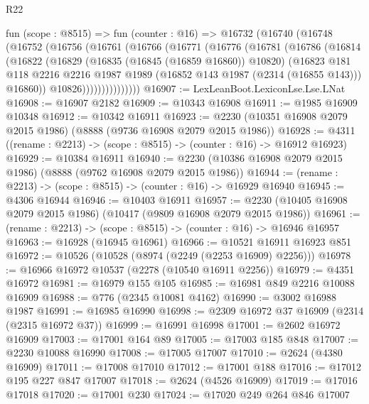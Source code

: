 \begin{lexlean}{R22}
\begin{coremodule}
        fun (scope : @8515) =>
        fun (counter : @16) =>
        @16732
          (@16740
            (@16748
              (@16752
                (@16756
                  (@16761
                    (@16766
                      (@16771
                        (@16776
                          (@16781
                            (@16786
                              (@16814
                                (@16822
                                  (@16829
                                    (@16835 (@16845 (@16859 @16860)) @10820)
                                    (@16823
                                      @181
                                      @118
                                      @2216
                                      @2216
                                      @1987
                                      @1989
                                      (@16852 @143 @1987 (@2314 (@16855 @143)))
                                      @16860))
                                  @10826)))))))))))))))
@16907 := LexLeanBoot.LexiconLse.Lse.LNat
@16908 := @16907 @2182
@16909 := @10343 @16908
@16911 := @1985 @16909 @10348
@16912 := @10342 @16911
@16923 := @2230 (@10351 @16908 @2079 @2015 @1986) (@8888 (@9736 @16908 @2079 @2015 @1986))
@16928 := @4311 ((rename : @2213) -> (scope : @8515) -> (counter : @16) -> @16912 @16923)
@16929 := @10384 @16911
@16940 := @2230 (@10386 @16908 @2079 @2015 @1986) (@8888 (@9762 @16908 @2079 @2015 @1986))
@16944 := (rename : @2213) -> (scope : @8515) -> (counter : @16) -> @16929 @16940
@16945 := @4306 @16944
@16946 := @10403 @16911
@16957 := @2230 (@10405 @16908 @2079 @2015 @1986) (@10417 (@9809 @16908 @2079 @2015 @1986))
@16961 := (rename : @2213) -> (scope : @8515) -> (counter : @16) -> @16946 @16957
@16963 := @16928 (@16945 @16961)
@16966 := @10521 @16911 @16923 @851
@16972 := @10526 (@10528 (@8974 (@2249 (@2253 @16909) @2256)))
@16978 := @16966 @16972 @10537 (@2278 (@10540 @16911 @2256))
@16979 := @4351 @16972
@16981 := @16979 @155 @105
@16985 := @16981 @849 @2216 @10088 @16909
@16988 := @776 (@2345 @10081 @4162)
@16990 := @3002 @16988 @1987
@16991 := @16985 @16990
@16998 := @2309 @16972 @37 @16909 (@2314 (@2315 @16972 @37))
@16999 := @16991 @16998
@17001 := @2602 @16972 @16909
@17003 := @17001 @164 @89
@17005 := @17003 @185 @848
@17007 := @2230 @10088 @16990
@17008 := @17005 @17007
@17010 := @2624 (@4380 @16909)
@17011 := @17008 @17010
@17012 := @17001 @188
@17016 := @17012 @195 @227 @847 @17007
@17018 := @2624 (@4526 @16909)
@17019 := @17016 @17018
@17020 := @17001 @230
@17024 := @17020 @249 @264 @846 @17007

\end{coremodule}
\end{lexlean}
